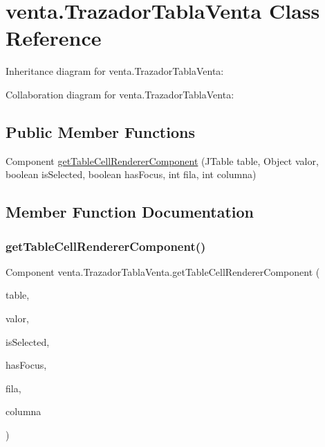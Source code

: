 \hypertarget{classventa_1_1_trazador_tabla_venta}{}\section{venta.\+Trazador\+Tabla\+Venta Class Reference}
\label{classventa_1_1_trazador_tabla_venta}


Inheritance diagram for venta.\+Trazador\+Tabla\+Venta\+:


Collaboration diagram for venta.\+Trazador\+Tabla\+Venta\+:
\subsection*{Public Member Functions}
\begin{DoxyCompactItemize}
\item 
Component \mbox{\hyperlink{classventa_1_1_trazador_tabla_venta_a99e2a2bf259c21864697e3e27f7f431d}{get\+Table\+Cell\+Renderer\+Component}} (J\+Table table, Object valor, boolean is\+Selected, boolean has\+Focus, int fila, int columna)
\end{DoxyCompactItemize}


\subsection{Member Function Documentation}
\mbox{\label{classventa_1_1_trazador_tabla_venta_a99e2a2bf259c21864697e3e27f7f431d}} 
\subsubsection{\texorpdfstring{get\+Table\+Cell\+Renderer\+Component()}{getTableCellRendererComponent()}}
{\footnotesize\ttfamily Component venta.\+Trazador\+Tabla\+Venta.\+get\+Table\+Cell\+Renderer\+Component (\begin{DoxyParamCaption}\item[{J\+Table}]{table,  }\item[{Object}]{valor,  }\item[{boolean}]{is\+Selected,  }\item[{boolean}]{has\+Focus,  }\item[{int}]{fila,  }\item[{int}]{columna }\end{DoxyParamCaption})\hspace{0.3cm}{\ttfamily [inline]}}

